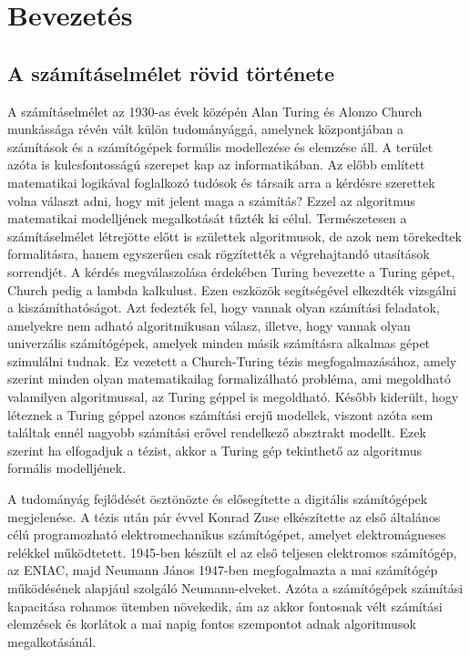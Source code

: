 \chapter{Bevezetés}
\label{ch:intro}

\section{A számításelmélet rövid története}
A számításelmélet az 1930-as évek középén Alan Turing és Alonzo Church munkássága révén vált külön tudományággá, amelynek központjában a számítások és a számítógépek formális modellezése és elemzése áll. A terület azóta is kulcsfontosságú szerepet kap az informatikában. Az előbb említett matematikai logikával foglalkozó tudósok és társaik arra a kérdésre szerettek volna választ adni, hogy mit jelent maga a számítás? Ezzel az algoritmus matematikai modelljének megalkotását tűzték ki célul. Természetesen a számításelmélet létrejötte előtt is születtek algoritmusok, de azok nem törekedtek formalitásra, hanem egyszerűen csak rögzítették a végrehajtandó utasítások sorrendjét. A kérdés megválaszolása érdekében Turing bevezette a Turing gépet, Church pedig a lambda kalkulust. Ezen eszközök segítségével elkezdték vizsgálni a kiszámíthatóságot. Azt fedezték fel, hogy vannak olyan számítási feladatok, amelyekre nem adható algoritmikusan válasz, illetve, hogy vannak olyan univerzális számítógépek, amelyek minden másik számításra alkalmas gépet szimulálni tudnak.
Ez vezetett a Church-Turing tézis megfogalmazásához, amely szerint minden olyan matematikailag formalizálható probléma, ami megoldható valamilyen algoritmussal, az Turing géppel is megoldható. Később kiderült, hogy léteznek a Turing géppel azonos számítási erejű modellek, viszont azóta sem találtak ennél nagyobb számítási erővel rendelkező absztrakt modellt. Ezek szerint ha elfogadjuk a tézist, akkor a Turing gép tekinthető az algoritmus formális modelljének.

A tudományág fejlődését ösztönözte és elősegítette a digitális számítógépek megjelenése. A tézis után pár évvel Konrad Zuse elkészítette az első általános célú programozható elektromechanikus számítógépet, amelyet elektromágneses relékkel működtetett. 1945-ben készült el az első teljesen elektromos számítógép, az ENIAC, majd Neumann János 1947-ben megfogalmazta a mai számítógép működésének alapjául szolgáló Neumann-elveket. Azóta a számítógépek számítási kapacitása rohamos ütemben növekedik, ám az akkor fontosnak vélt számítási elemzések és korlátok a mai napig fontos szempontot adnak algoritmusok megalkotásánál.


